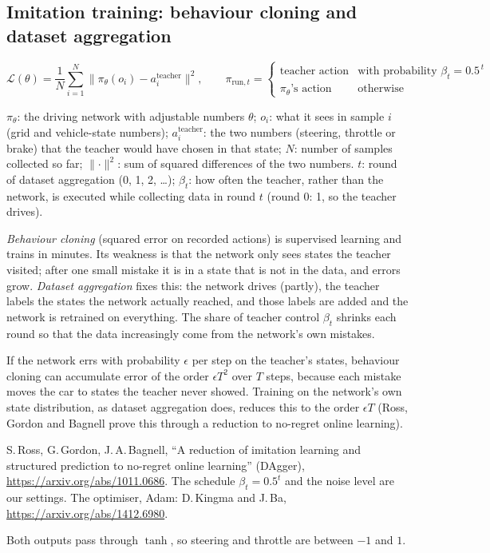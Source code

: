 \subsection{Imitation training: behaviour cloning and dataset aggregation}
\[\mathcal L(\theta)=\frac1N\sum_{i=1}^{N}\big\lVert \pi_\theta(o_i)-a_i^{\text{teacher}}\big\rVert^2,\qquad \pi_{\text{run},t}=\begin{cases}\text{teacher action}&\text{with probability }\beta_t=0.5^{\,t}\\ \pi_\theta\text{'s action}&\text{otherwise}\end{cases}\]
\begin{description}[leftmargin=2.6cm,style=nextline]
\item[Symbols] $\pi_\theta$: the driving network with adjustable numbers $\theta$; $o_i$: what it sees in sample $i$ (grid and vehicle-state numbers); $a_i^{\text{teacher}}$: the two numbers (steering, throttle or brake) that the teacher would have chosen in that state; $N$: number of samples collected so far; $\lVert\cdot\rVert^2$: sum of squared differences of the two numbers. $t$: round of dataset aggregation (0, 1, 2, \dots); $\beta_t$: how often the teacher, rather than the network, is executed while collecting data in round $t$ (round 0: 1, so the teacher drives).
\item[Why] \emph{Behaviour cloning} (squared error on recorded actions) is supervised learning and trains in minutes. Its weakness is that the network only sees states the teacher visited; after one small mistake it is in a state that is not in the data, and errors grow. \emph{Dataset aggregation} fixes this: the network drives (partly), the teacher labels the states the network actually reached, and those labels are added and the network is retrained on everything. The share of teacher control $\beta_t$ shrinks each round so that the data increasingly come from the network's own mistakes.
\item[Derivation of the idea] If the network errs with probability $\epsilon$ per step on the teacher's states, behaviour cloning can accumulate error of the order $\epsilon T^2$ over $T$ steps, because each mistake moves the car to states the teacher never showed. Training on the network's own state distribution, as dataset aggregation does, reduces this to the order $\epsilon T$ (Ross, Gordon and Bagnell prove this through a reduction to no-regret online learning).
\item[Source] S.\,Ross, G.\,Gordon, J.\,A.\,Bagnell, ``A reduction of imitation learning and structured prediction to no-regret online learning'' (DAgger), \url{https://arxiv.org/abs/1011.0686}. The schedule $\beta_t=0.5^t$ and the noise level are our settings. The optimiser, Adam: D.\,Kingma and J.\,Ba, \url{https://arxiv.org/abs/1412.6980}.
\item[Network output] Both outputs pass through $\tanh$, so steering and throttle are between $-1$ and $1$.
\end{description}

